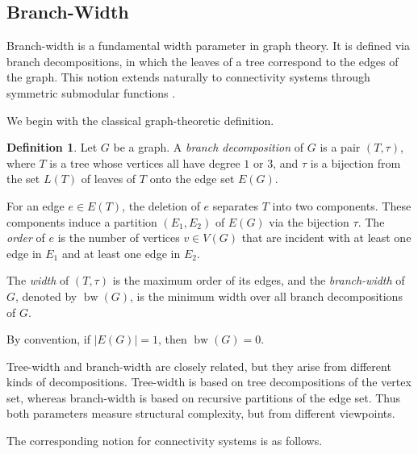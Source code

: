 \documentclass[10pt]{book}
\theoremstyle{definition}
\newtheorem{definition}[theorem]{Definition}
\begin{document}
\subsection{Branch-Width}

Branch-width is a fundamental width parameter in graph theory.
It is defined via branch decompositions, in which the leaves of a tree correspond
to the edges of the graph.
This notion extends naturally to connectivity systems through symmetric submodular functions
\cite{9,10,16,geelen2002branch}.

We begin with the classical graph-theoretic definition.

\begin{definition}\cite{282}
Let \(G\) be a graph.
A \emph{branch decomposition} of \(G\) is a pair \((T,\tau)\), where
\(T\) is a tree whose vertices all have degree \(1\) or \(3\), and
\(\tau\) is a bijection from the set \(L(T)\) of leaves of \(T\) onto the edge set \(E(G)\).

For an edge \(e\in E(T)\), the deletion of \(e\) separates \(T\) into two components.
These components induce a partition \((E_1,E_2)\) of \(E(G)\) via the bijection \(\tau\).
The \emph{order} of \(e\) is the number of vertices \(v\in V(G)\) that are incident with
at least one edge in \(E_1\) and at least one edge in \(E_2\).

The \emph{width} of \((T,\tau)\) is the maximum order of its edges, and
the \emph{branch-width} of \(G\), denoted by \(\operatorname{bw}(G)\),
is the minimum width over all branch decompositions of \(G\).

By convention, if \(|E(G)|=1\), then \(\operatorname{bw}(G)=0\).
\end{definition}

Tree-width and branch-width are closely related, but they arise from different kinds
of decompositions.
Tree-width is based on tree decompositions of the vertex set,
whereas branch-width is based on recursive partitions of the edge set.
Thus both parameters measure structural complexity, but from different viewpoints.

The corresponding notion for connectivity systems is as follows.
\end{document}
